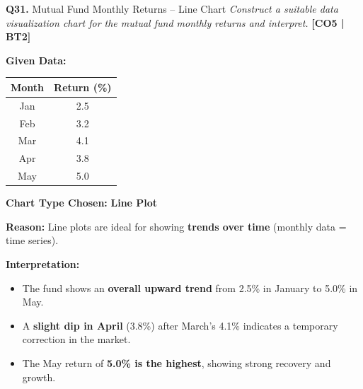 \documentclass[12pt,a4paper]{article}
\newcommand{\Qno}[1]{\textbf{\color{darkred}Q#1.}}
\newcommand{\term}[1]{\textbf{\color{headingcolor}#1}}
\begin{document}
\vspace{8pt}

\begin{questionbox}{\Qno{31} Mutual Fund Monthly Returns -- Line Chart}
\textit{Construct a suitable data visualization chart for the mutual fund monthly returns and interpret.} \hfill \textbf{[CO5 | BT2]}
\end{questionbox}

\begin{answerenv}

\textbf{\color{headingcolor}Given Data:}
\begin{center}
\begin{tabular}{cc}
\toprule
\textbf{Month} & \textbf{Return (\%)} \\
\midrule
Jan & 2.5 \\
Feb & 3.2 \\
Mar & 4.1 \\
Apr & 3.8 \\
May & 5.0 \\
\bottomrule
\end{tabular}
\end{center}

\textbf{\color{headingcolor}Chart Type Chosen:} \term{Line Plot}

\textbf{Reason:} Line plots are ideal for showing \textbf{trends over time} (monthly data = time series).

\begin{center}
\end{center}

\textbf{\color{headingcolor}Interpretation:}
\begin{itemize}[leftmargin=1.5em, itemsep=3pt]
  \item The fund shows an \term{overall upward trend} from 2.5\% in January to 5.0\% in May.
  \item A \term{slight dip in April} (3.8\%) after March's 4.1\% indicates a temporary correction in the market.
  \item The May return of \textbf{5.0\% is the highest}, showing strong recovery and growth.
\end{itemize}


\end{answerenv}
\end{document}
